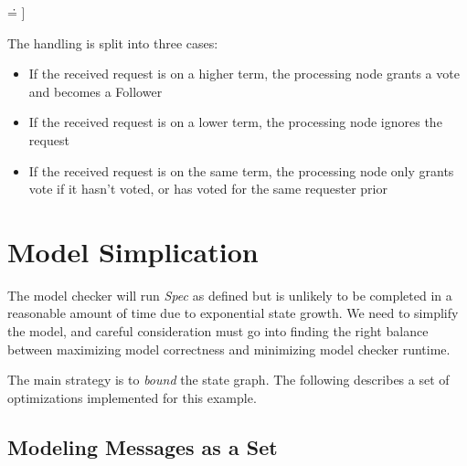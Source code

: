 \begin{tlatex}
{ \.{=} ]}%
 \@x{\@s{36.89} \.{\land} messages \.{'} \.{=} AddMessage ( [ fSrc \.{\mapsto}
 i ,\,}%
%
%
%
\@x{\@s{40.99} fSuccess \.{\mapsto} 1 ] ,\,}%
%
\end{tlatex}
\newline

The handling is split into three cases: 
\begin{itemize}
    \item If the received request is on a higher term, the processing node grants a vote and becomes a Follower
    \item If the received request is on a lower term, the processing node ignores the request
    \item If the received request is on the same term, the processing node only grants
    vote if it hasn't voted, or has voted for the same requester prior 
\end{itemize}

\section{Model Simplication}

The model checker will run \textit{Spec} as defined but is unlikely to be
completed in a reasonable amount of time due to exponential state growth. We
need to simplify the model, and careful consideration must go into finding the
right balance between maximizing model correctness and minimizing model checker
runtime.\newline

The main strategy is to \textit{bound} the state graph. The following describes
a set of optimizations implemented for this example.

\subsection{Modeling Messages as a Set}

